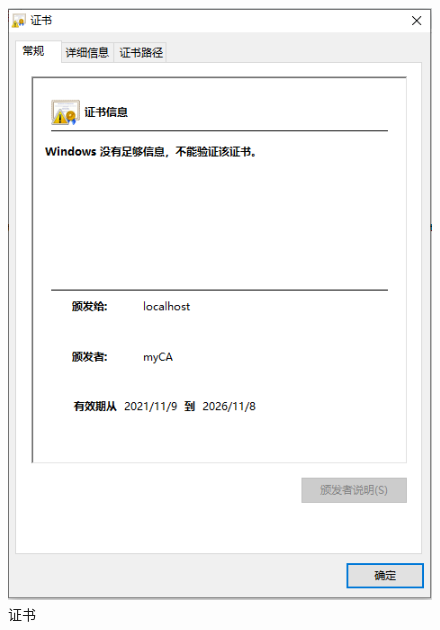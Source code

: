 \begin{figure}
\begin{center}
\includegraphics{figs/certificate.PNG}
\end{center}
\caption{证书}
\label{certificate}
\end{figure}

